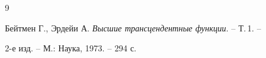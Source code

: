  


\begin{thebibliography}{9} 


 




Бейтмен Г., Эрдейи А. {\em Высшие трансцендентные функции}. -- Т.\,1. -- 


2-е изд. -- М.: Наука, 1973. -- 294 с. 


 


\end{thebibliography} 


 


\vskip 2cm 


 






 


\label{end} 


 


